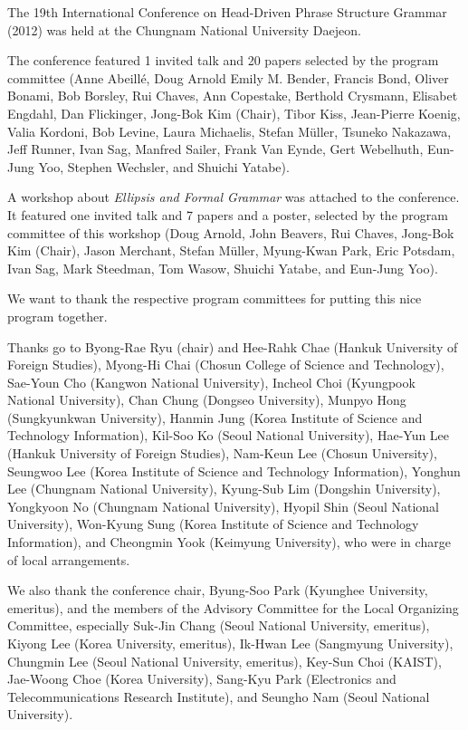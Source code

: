 The 19th International Conference on Head-Driven Phrase Structure Grammar (2012) was held at the Chungnam National University Daejeon.

The conference featured 1 invited talk and 20 papers selected by the program committee (Anne
Abeillé,
Doug Arnold
Emily M. Bender,
Francis Bond,
Oliver Bonami,
Bob Borsley,
Rui Chaves,	Ann Copestake,
Berthold Crysmann, 	Elisabet Engdahl,
Dan Flickinger, 	Jong-Bok Kim (Chair),
Tibor Kiss, 	Jean-Pierre Koenig,
Valia Kordoni, 	Bob Levine,
Laura Michaelis, 	Stefan Müller,
Tsuneko Nakazawa, 	Jeff Runner,
Ivan Sag, 	Manfred Sailer,
Frank Van Eynde, 	Gert Webelhuth,
Eun-Jung Yoo, 	Stephen Wechsler, and
Shuichi Yatabe).

A workshop about \emph{Ellipsis and Formal Grammar}
was attached to the conference. It featured one invited talk and 7 papers and a poster, selected by the program
committee of this workshop (Doug Arnold, 	John Beavers,
Rui Chaves, 	Jong-Bok Kim (Chair),
Jason Merchant, 	Stefan Müller,
Myung-Kwan Park, 	Eric Potsdam,
Ivan Sag, 	Mark Steedman,
Tom Wasow, 	Shuichi Yatabe, and
Eun-Jung Yoo).

We want to thank the respective program committees for putting this nice program together.



Thanks go to Byong-Rae Ryu (chair) and Hee-Rahk Chae (Hankuk University of Foreign Studies),
Myong-Hi Chai (Chosun College of Science and Technology), Sae-Youn Cho (Kangwon National
University), Incheol Choi (Kyungpook National University), Chan Chung (Dongseo University), Munpyo
Hong (Sung\-kyun\-kwan University), Hanmin Jung (Korea Institute of Science and Technology Information),
Kil-Soo Ko (Seoul National University), Hae-Yun Lee (Hankuk University of Foreign Studies), Nam-Keun
Lee (Chosun University), Seungwoo Lee (Korea Institute of Science and Technology Information),
Yonghun Lee (Chungnam National University), Kyung-Sub Lim (Dongshin University), Yongkyoon No
(Chungnam National University), Hyopil Shin (Seoul National University), Won-Kyung Sung (Korea
Institute of Science and Technology Information), and Cheongmin Yook (Keimyung University), who were
in charge of local arrangements.
 
We also thank the conference chair, Byung-Soo Park (Kyunghee University, emeritus), and the members
of the Advisory Committee for the Local Organizing Committee, especially Suk-Jin Chang (Seoul
National University, emeritus), Kiyong Lee (Korea University, emeritus), Ik-Hwan Lee (Sangmyung
University), Chungmin Lee (Seoul National University, emeritus), Key-Sun Choi (KAIST), Jae-Woong
Choe (Korea University), Sang-Kyu Park (Electronics and Telecommunications Research Institute), and
Seungho Nam (Seoul National University).


